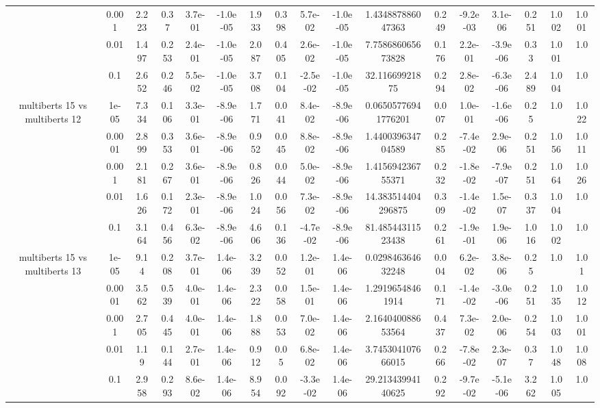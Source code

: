 \begin{tabular}{|c|c|c|c|c|c|c|c|c|c|c|c|c|c|c|c|c|}
 & 0.001 & 2.223 & 0.37 & 3.7e-01 & -1.0e-05 & 1.933 & 0.398 & 5.7e-02 & -1.0e-05 & 1.434887886047363 & 0.249 & -9.2e-03 & 3.1e-06 & 0.251 & 1.002 & 1.001 \\
 & 0.01 & 1.497 & 0.253 & 2.4e-01 & -1.0e-05 & 2.087 & 0.405 & 2.6e-02 & -1.0e-05 & 7.758686065673828 & 0.176 & 2.2e-01 & -3.9e-06 & 0.33 & 1.001 & 1.0 \\
 & 0.1 & 2.652 & 0.246 & 5.5e-02 & -1.0e-05 & 3.708 & 0.104 & -2.5e-02 & -1.0e-05 & 32.11669921875 & 0.294 & 2.8e-02 & -6.3e-06 & 2.489 & 1.004 & 1.0 \\
\hline
\multirow{5}{*}{multiberts 15 vs multiberts 12} & 1e-05 & 7.334 & 0.106 & 3.3e-01 & -8.9e-06 & 1.771 & 0.041 & 8.4e-02 & -8.9e-06 & 0.06505776941776201 & 0.007 & 1.0e-01 & -1.6e-06 & 0.25 & 1.0 & 1.022 \\
 & 0.0001 & 2.899 & 0.353 & 3.6e-01 & -8.9e-06 & 0.952 & 0.045 & 8.8e-02 & -8.9e-06 & 1.440039634704589 & 0.285 & -7.4e-02 & 2.9e-06 & 0.251 & 1.056 & 1.011 \\
 & 0.001 & 2.181 & 0.267 & 3.6e-01 & -8.9e-06 & 0.826 & 0.044 & 5.0e-02 & -8.9e-06 & 1.415694236755371 & 0.232 & -1.8e-02 & -7.9e-07 & 0.251 & 1.064 & 1.026 \\
 & 0.01 & 1.626 & 0.172 & 2.3e-01 & -8.9e-06 & 1.024 & 0.056 & 7.3e-02 & -8.9e-06 & 14.383514404296875 & 0.309 & -1.4e-02 & 1.5e-07 & 0.337 & 1.004 & 1.0 \\
 & 0.1 & 3.164 & 0.456 & 6.3e-02 & -8.9e-06 & 4.606 & 0.136 & -4.7e-02 & -8.9e-06 & 81.48544311523438 & 0.261 & -1.9e-01 & 1.9e-06 & 1.016 & 1.002 & 1.0 \\
\hline
\multirow{5}{*}{multiberts 15 vs multiberts 13} & 1e-05 & 9.14 & 0.208 & 3.7e-01 & 1.4e-06 & 3.239 & 0.052 & 1.2e-01 & 1.4e-06 & 0.029846364632248 & 0.004 & 6.2e-02 & 3.8e-06 & 0.25 & 1.0 & 1.01 \\
 & 0.0001 & 3.562 & 0.539 & 4.0e-01 & 1.4e-06 & 2.322 & 0.058 & 1.5e-01 & 1.4e-06 & 1.29196548461914 & 0.171 & -1.4e-02 & -3.0e-06 & 0.251 & 1.035 & 1.012 \\
 & 0.001 & 2.705 & 0.445 & 4.0e-01 & 1.4e-06 & 1.888 & 0.053 & 7.0e-02 & 1.4e-06 & 2.164040088653564 & 0.437 & 7.3e-02 & 2.0e-06 & 0.254 & 1.003 & 1.001 \\
 & 0.01 & 1.19 & 0.144 & 2.7e-01 & 1.4e-06 & 0.912 & 0.05 & 6.8e-02 & 1.4e-06 & 3.745304107666015 & 0.266 & -7.8e-02 & 2.3e-07 & 0.37 & 1.048 & 1.008 \\
 & 0.1 & 2.958 & 0.293 & 8.6e-02 & 1.4e-06 & 8.954 & 0.092 & -3.3e-02 & 1.4e-06 & 29.21343994140625 & 0.292 & -9.7e-02 & -5.1e-06 & 3.262 & 1.005 & 1.0 \\

\end{tabular}
